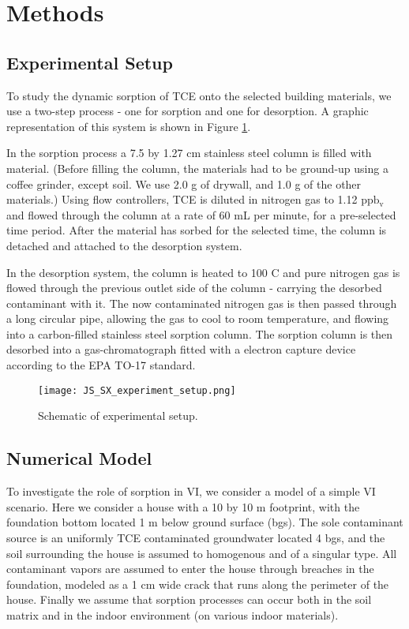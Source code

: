 \section{Methods}\label{sec:methods}

\subsection{Experimental Setup}\label{sec:experimental_method}

To study the dynamic sorption of TCE onto the selected building materials, we use a two-step process - one for sorption and one for desorption.
A graphic representation of this system is shown in Figure \ref{fig:js_sx_setup}.

In the sorption process a 7.5 by 1.27 cm stainless steel column is filled with material.
(Before filling the column, the materials had to be ground-up using a coffee grinder, except soil.
We use 2.0 g of drywall, and 1.0 g of the other materials.)
Using flow controllers, TCE is diluted in nitrogen gas to 1.12 $\mathrm{ppb_v}$ and flowed through the column at a rate of 60 mL per minute, for a pre-selected time period.
After the material has sorbed for the selected time, the column is detached and attached to the desorption system.

In the desorption system, the column is heated to 100 \degree C and pure nitrogen gas is flowed through the previous outlet side of the column - carrying the desorbed contaminant with it.
The now contaminated nitrogen gas is then passed through a long circular pipe, allowing the gas to cool to room temperature, and flowing into a carbon-filled stainless steel sorption column.
The sorption column is then desorbed into a gas-chromatograph fitted with a electron capture device according to the EPA TO-17 standard.

\begin{figure}
  \texttt{[image: JS\_SX\_experiment\_setup.png]}
  \caption{Schematic of experimental setup.} %
  \label{fig:js_sx_setup}
\end{figure}

\subsection{Numerical Model}\label{sec:model}

To investigate the role of sorption in VI, we consider a model of a simple VI scenario.
Here we consider a house with a 10 by 10 m footprint, with the foundation bottom located 1 m below ground surface (bgs).
The sole contaminant source is an uniformly TCE contaminated groundwater located 4 bgs, and the soil surrounding the house is assumed to homogenous and of a singular type.
All contaminant vapors are assumed to enter the house through breaches in the foundation, modeled as a 1 cm wide crack that runs along the perimeter of the house.
Finally we assume that sorption processes can occur both in the soil matrix and in the indoor environment (on various indoor materials).\par

